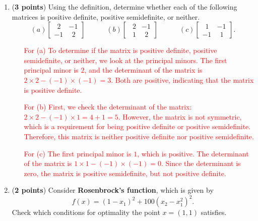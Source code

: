 \documentclass[11pt]{article}
\begin{document}
\begin{enumerate}
\item ({\bf 3 points}) Using the definition, determine whether each of the following
  matrices is positive definite, positive semidefinite, or neither.
  $$
  (a)
  \begin{bmatrix}
    \ \ 2 & -1 \\ -1 & \ \ 2
  \end{bmatrix}
  \qquad \quad
  (b)
  \begin{bmatrix}
    \ \ 2 & -1\\  \ \  1 & \ \ 2
  \end{bmatrix}
  \qquad \quad
  (c)
  \begin{bmatrix}
    \ \ 1 & -1 \\ -1 & \ \ 1
  \end{bmatrix}.
  $$
    \begin{enumerate}
        \item[\textcolor{red}{For (a)}] \textcolor{red}{
            To determine if the matrix is positive definite, positive semidefinite, or neither, we look at the principal minors. The first principal minor is $2$, and the determinant of the matrix is $2 \times 2 - (-1) \times (-1) = 3$. Both are positive, indicating that the matrix is positive definite.
        }
    \end{enumerate}
  
      \begin{enumerate}
        \item[\textcolor{red}{For (b)}] \textcolor{red}{
            First, we check the determinant of the matrix: $2 \times 2 - (-1) \times 1 = 4 + 1 = 5$. However, the matrix is not symmetric, which is a requirement for being positive definite or positive semidefinite. Therefore, this matrix is neither positive definite nor positive semidefinite.
        }
    \end{enumerate}

    \begin{enumerate}
        \item[\textcolor{red}{For (c)}] \textcolor{red}{
            The first principal minor is $1$, which is positive. The determinant of the matrix is $1 \times 1 - (-1) \times (-1) = 0$. Since the determinant is zero, the matrix is positive semidefinite, but not positive definite.
        }
    \end{enumerate}


\item ({\bf 2 points}) Consider \textbf{Rosenbrock's function}, which is given by
  $$
  f(x) = (1 - x_1)^2 + 100(x_2 - x_1^2)^2.
  $$
  Check which conditions for optimality the point $x = (1,1)$ satisfies.


\end{enumerate}
\end{document}
